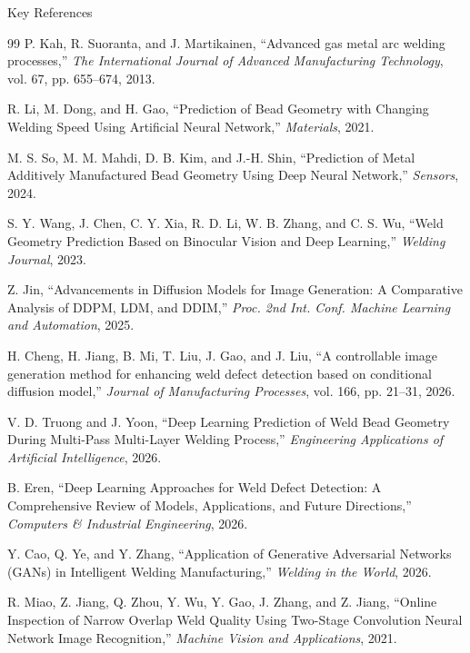 \documentclass[aspectratio=169]{beamer}
\begin{document}
\begin{frame}[allowframebreaks]{Key References}
	\scriptsize
	\begin{thebibliography}{99}
		P. Kah, R. Suoranta, and J. Martikainen,
		``Advanced gas metal arc welding processes,''
		\textit{The International Journal of Advanced Manufacturing Technology}, vol. 67, pp. 655--674, 2013.
		
		R. Li, M. Dong, and H. Gao,
		``Prediction of Bead Geometry with Changing Welding Speed Using Artificial Neural Network,''
		\textit{Materials}, 2021.
		
		M. S. So, M. M. Mahdi, D. B. Kim, and J.-H. Shin,
		``Prediction of Metal Additively Manufactured Bead Geometry Using Deep Neural Network,''
		\textit{Sensors}, 2024.
		
		S. Y. Wang, J. Chen, C. Y. Xia, R. D. Li, W. B. Zhang, and C. S. Wu,
		``Weld Geometry Prediction Based on Binocular Vision and Deep Learning,''
		\textit{Welding Journal}, 2023.
		
		Z. Jin,
		``Advancements in Diffusion Models for Image Generation: A Comparative Analysis of DDPM, LDM, and DDIM,''
		\textit{Proc. 2nd Int. Conf. Machine Learning and Automation}, 2025.
		
		H. Cheng, H. Jiang, B. Mi, T. Liu, J. Gao, and J. Liu,
		``A controllable image generation method for enhancing weld defect detection based on conditional diffusion model,''
		\textit{Journal of Manufacturing Processes}, vol. 166, pp. 21--31, 2026.
		
		V. D. Truong and J. Yoon,
		``Deep Learning Prediction of Weld Bead Geometry During Multi-Pass Multi-Layer Welding Process,''
		\textit{Engineering Applications of Artificial Intelligence}, 2026.
		
		B. Eren,
		``Deep Learning Approaches for Weld Defect Detection: A Comprehensive Review of Models, Applications, and Future Directions,''
		\textit{Computers \& Industrial Engineering}, 2026.
		
		Y. Cao, Q. Ye, and Y. Zhang,
		``Application of Generative Adversarial Networks (GANs) in Intelligent Welding Manufacturing,''
		\textit{Welding in the World}, 2026.
		
		R. Miao, Z. Jiang, Q. Zhou, Y. Wu, Y. Gao, J. Zhang, and Z. Jiang,
		``Online Inspection of Narrow Overlap Weld Quality Using Two-Stage Convolution Neural Network Image Recognition,''
		\textit{Machine Vision and Applications}, 2021.
	\end{thebibliography}
\end{frame}
\end{document}
